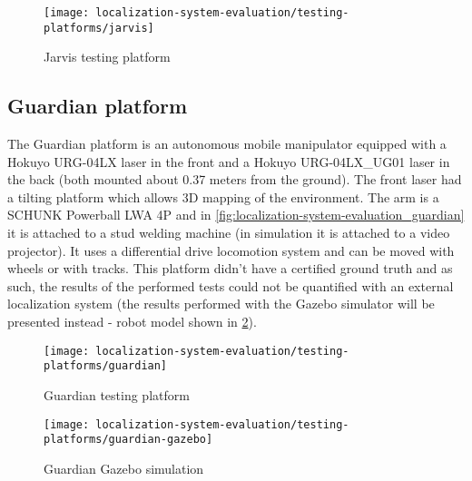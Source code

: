 \begin{figure}[H]
	\centering
	\texttt{[image: localization-system-evaluation/testing-platforms/jarvis]}
	\caption{Jarvis testing platform}
	\label{fig:localization-system-evaluation_jarvis}
\end{figure}


\subsection{Guardian platform}

The Guardian platform is an autonomous mobile manipulator equipped with a Hokuyo URG-04LX laser in the front and a Hokuyo URG-04LX\_UG01 laser in the back (both mounted about 0.37 meters from the ground). The front laser had a tilting platform which allows 3D mapping of the environment. The arm is a SCHUNK Powerball LWA 4P and in \cref{fig:localization-system-evaluation_guardian} it is attached to a stud welding machine (in simulation it is attached to a video projector). It uses a differential drive locomotion system and can be moved with wheels or with tracks. This platform didn't have a certified ground truth and as such, the results of the performed tests could not be quantified with an external localization system (the results performed with the Gazebo simulator will be presented instead - robot model shown in \cref{fig:localization-system-evaluation_guardian_gazebo}).

\begin{figure}
	\centering
	\begin{minipage}[h]{0.497\textwidth}
		\centering
		\texttt{[image: localization-system-evaluation/testing-platforms/guardian]}
		\caption{Guardian testing platform}
		\label{fig:localization-system-evaluation_guardian}
	\end{minipage}\hfill
	\begin{minipage}[h]{0.497\textwidth}
		\centering
		\texttt{[image: localization-system-evaluation/testing-platforms/guardian-gazebo]}
		\caption{Guardian Gazebo simulation}
		\label{fig:localization-system-evaluation_guardian_gazebo}
	\end{minipage}
\end{figure}



